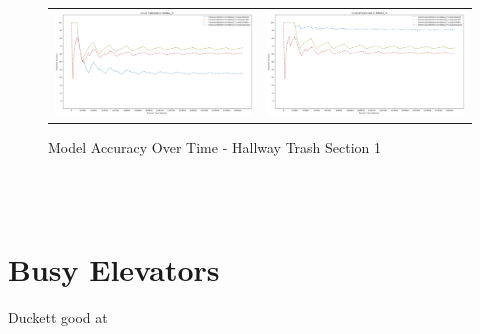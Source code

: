 \begin{figure}
  \begin{tabular}{cc}
    {\includegraphics[width = 3in]{images/results/Future_Predictions_on_hallway_T1.png}} &
    {\includegraphics[width = 3in]{images/results/Historical_Predictions_on_hallway_T1.png}} \\
  \end{tabular}
  \caption{Model Accuracy Over Time - Hallway Trash Section 1}
\end{figure}\\ \\





\section{ Busy Elevators }


Duckett good at

